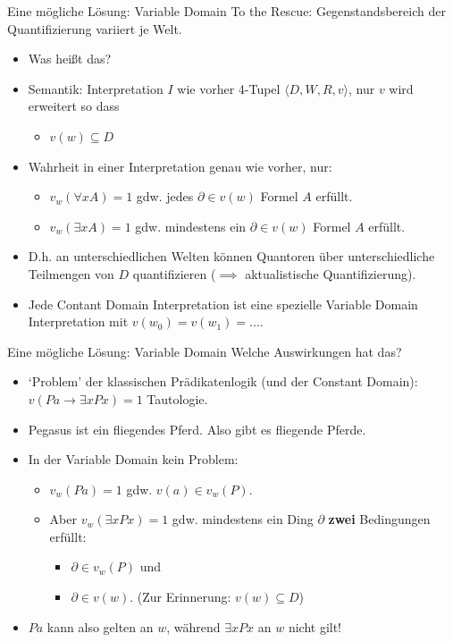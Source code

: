 \documentclass[12pt]{beamer}
\begin{document}
\begin{frame}{Eine mögliche Lösung: Variable Domain}
  To the Rescue: Gegenstandsbereich der Quantifizierung variiert je
  Welt.
  \begin{itemize}[<+->]
  \item Was heißt das?
  \item Semantik: Interpretation $I$ wie vorher 4-Tupel
    $\langle D, W, R, v \rangle$, nur $v$ wird erweitert so dass
    \begin{itemize}[<+->]
    \item $v(w) \subseteq D$
    \end{itemize}
  \item Wahrheit in einer Interpretation genau wie vorher, nur:
    \begin{itemize}[<+->]
    \item $v_w(\forall x A) = 1$ gdw. jedes $\partial \in v(w)$ Formel
      $A$ erfüllt.
    \item $v_w(\exists x A) = 1$ gdw. mindestens ein
      $\partial \in v(w)$ Formel $A$ erfüllt.
    \end{itemize}
  \item D.h. an unterschiedlichen Welten können Quantoren über
    unterschiedliche Teilmengen von $D$ quantifizieren ($\implies$
    aktualistische Quantifizierung).
  \item Jede Contant Domain Interpretation ist eine spezielle Variable
    Domain Interpretation mit $v(w_0) = v(w_1) = ...$.
  \end{itemize}

\end{frame}

\begin{frame}{Eine mögliche Lösung: Variable Domain}
  Welche Auswirkungen hat das?
  \begin{itemize}[<+->]
  \item `Problem' der klassischen Prädikatenlogik (und der Constant
    Domain): $v(Pa \to \exists x Px) = 1$ Tautologie.
  \item Pegasus ist ein fliegendes Pferd. Also gibt es fliegende
    Pferde.
  \item In der Variable Domain kein Problem:
    \begin{itemize}[<+->]
    \item $v_w(Pa) = 1$ gdw. $v(a) \in v_w(P)$.
    \item Aber $v_w(\exists x Px) = 1$ gdw. mindestens ein Ding
      $\partial$ \textbf{zwei} Bedingungen erfüllt:
      \begin{itemize}
      \item $\partial \in v_w(P)$ und
      \item $\partial \in v(w)$. (Zur Erinnerung: $v(w) \subseteq D$)
      \end{itemize}
    \end{itemize}
  \item $Pa$ kann also gelten an $w$, während $\exists x Px$ an $w$
    nicht gilt!
  \end{itemize}
\end{frame}
\end{document}
